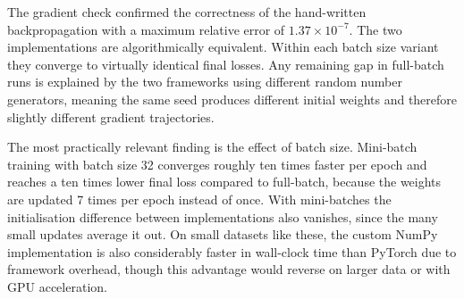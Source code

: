\documentclass[fleqn,moreauthors,10pt]{ds_report}
\begin{document}
The gradient check confirmed the correctness of the hand-written backpropagation
with a maximum relative error of $1.37 \times 10^{-7}$. The two implementations
are algorithmically equivalent. Within each batch size variant they converge to
virtually identical final losses. Any remaining gap in full-batch runs is explained
by the two frameworks using different random number generators, meaning the same seed produces different initial weights
and therefore slightly different gradient trajectories.

The most practically relevant finding is the effect of batch size. Mini-batch
training with batch size 32 converges roughly ten times faster per epoch and
reaches a ten times lower final loss compared to full-batch, because the weights
are updated 7 times per epoch instead of once. With mini-batches the initialisation
difference between implementations also vanishes, since the many small updates
average it out. On small datasets like these, the custom NumPy implementation is
also considerably faster in wall-clock time than PyTorch due to framework overhead,
though this advantage would reverse on larger data or with GPU acceleration.
\end{document}
